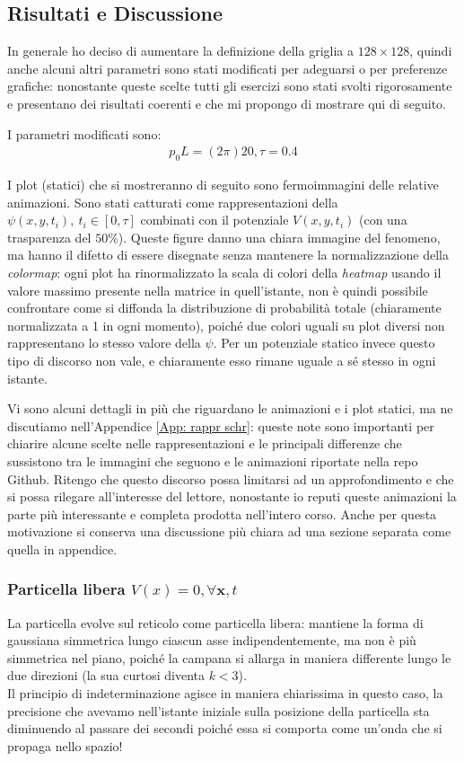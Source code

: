\subsection{Risultati e Discussione}
In generale ho deciso di aumentare la definizione della griglia a $128\times128$, quindi anche alcuni altri parametri sono stati modificati per adeguarsi o per preferenze grafiche: nonostante queste scelte tutti gli esercizi sono stati svolti rigorosamente e presentano dei risultati coerenti e che mi propongo di mostrare qui di seguito.

\medskip\noindent
I parametri modificati sono:
\begin{align*}
    p_0L = (2\pi)20 , \tau =0.4
\end{align*}

\noindent I plot (statici) che si mostreranno di seguito sono fermoimmagini delle relative animazioni. Sono stati catturati come rappresentazioni della $\psi(x, y, t_i),\ t_i\in [0, \tau]$ combinati con il potenziale $V(x, y, t_i)$ (con una trasparenza del $50\%$). Queste figure danno una chiara immagine del fenomeno, ma hanno il difetto di essere disegnate senza mantenere la normalizzazione della \textit{colormap}: ogni plot ha rinormalizzato la scala di colori della \textit{heatmap} usando il valore massimo presente nella matrice in quell'istante, non è quindi possibile confrontare come si diffonda la distribuzione di probabilità totale (chiaramente normalizzata a 1 in ogni momento), poiché due colori uguali su plot diversi non rappresentano lo stesso valore della $\psi$. Per un potenziale statico invece questo tipo di discorso non vale, e chiaramente esso rimane uguale a sé stesso in ogni istante.

\medskip\noindent
Vi sono alcuni dettagli in più che riguardano le animazioni e i plot statici, ma ne discutiamo nell'Appendice \ref{App: rappr schr}: queste note sono importanti per chiarire alcune scelte nelle rappresentazioni e le principali differenze che sussistono tra le immagini che seguono e le animazioni riportate nella repo Github. Ritengo che questo discorso possa limitarsi ad un approfondimento e che si possa rilegare all'interesse del lettore, nonostante io reputi queste animazioni la parte più interessante e completa prodotta nell'intero corso. Anche per questa motivazione si conserva una discussione più chiara ad una sezione separata come quella in appendice.


\subsubsection{Particella libera $V(x)=0, \forall \boldsymbol x, t$}
La particella evolve sul reticolo come particella libera: mantiene la forma di gaussiana simmetrica lungo ciascun asse indipendentemente, ma non è più simmetrica nel piano, poiché la campana si allarga in maniera differente lungo le due direzioni (la sua curtosi diventa $k<3$).\\
Il principio di indeterminazione agisce in maniera chiarissima in questo caso, la precisione che avevamo nell'istante iniziale sulla posizione della particella sta diminuendo al passare dei secondi poiché essa si comporta come un'onda che si propaga nello spazio!

